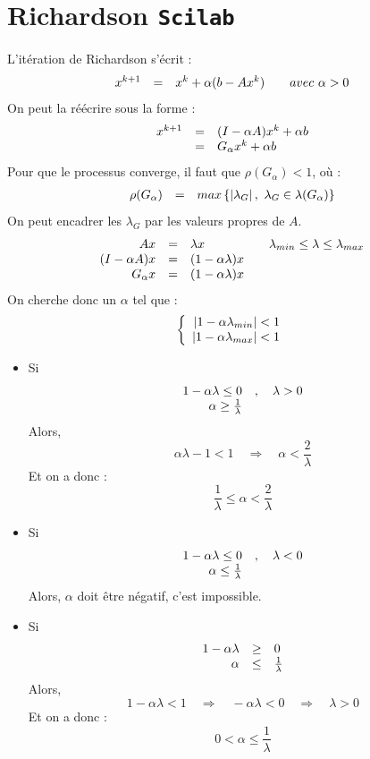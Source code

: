 \documentclass{article}
\begin{document}
\section{Richardson \texttt{Scilab}}
L'itération de Richardson s'écrit : 
\[
	\begin{array}{r c l r}
		x^{k+1} & = & x^k + \alpha(b-Ax^k) & \quad avec\ \alpha > 0
	\end{array}
\]
On peut la réécrire sous la forme :
\[
	\begin{array}{r c l}
		x^{k+1} & = & (I-\alpha A)x^k + \alpha b \\
		 		& = & G_\alpha x^k + \alpha b
	\end{array}
\]
Pour que le processus converge, il faut que $\rho (G_\alpha) < 1$, où :
\[
	\begin{array}{r c l}
		\rho (G_\alpha) & = & max\left\lbrace \left| \lambda_G \right|,\ \lambda_G\in\lambda (G_\alpha)\right\rbrace
	\end{array}
\]
On peut encadrer les $\lambda_G$ par les valeurs propres de $A$.
\[
	\begin{array}{r c l r}
		Ax & = & \lambda x & \quad \lambda_{min} \leq \lambda \leq \lambda_{max}\\
		(I-\alpha A)x & = & (1-\alpha \lambda) x &\\
		G_\alpha x & = & (1-\alpha \lambda) x &\\
	\end{array}
\]
On cherche donc un $\alpha$ tel que :
\[
	\left \{
	\begin{array}{r c l}
		\left| 1 - \alpha \lambda_{min} \right| < 1 \\
		\left| 1 - \alpha \lambda_{max} \right| < 1 \\
	\end{array}
	\right .
\]
\begin{itemize}
\item Si 
\[
	\begin{array}{r c l}
		1 - \alpha \lambda \leq 0 & , \quad \lambda > 0 \\
		\alpha \geq \frac{1}{\lambda} & \\
	\end{array}
\]
Alors, 
\[
		\alpha \lambda - 1 < 1 \quad
		\Rightarrow \quad \alpha < \frac{2}{\lambda}
\]
Et on a donc :
\[
		\frac{1}{\lambda} \leq \alpha < \frac{2}{\lambda}
\]
\item Si 
\[
	\begin{array}{r c l}
		1 - \alpha \lambda \leq 0 & , \quad \lambda < 0 \\
		\alpha \leq \frac{1}{\lambda} & \\
	\end{array}
\]
Alors, $\alpha$ doit être négatif, c'est impossible.
\item Si 
\[
	\begin{array}{r c l}
		1 - \alpha \lambda & \geq & 0 \\
		\alpha & \leq & \frac{1}{\lambda} \\
	\end{array}
\]
Alors, 
\[
		1 - \alpha \lambda < 1 \quad
		\Rightarrow \quad -\alpha \lambda < 0 \quad
		\Rightarrow \quad \lambda > 0
\]
Et on a donc :
\[
		0 < \alpha \leq \frac{1}{\lambda}
\]
\end{itemize}
\end{document}
